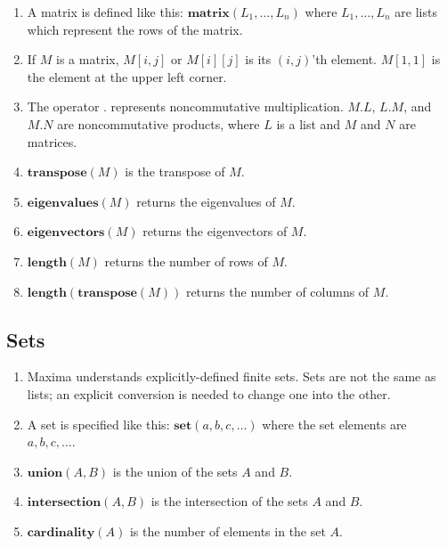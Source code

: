 \documentclass[12pt]{article}
\begin{document}
\begin{enumerate}

\item A matrix is defined like this: $\mathbf{matrix}(L_1, \ldots, L_n)$
    where $L_1, \ldots, L_n$ are lists which represent the rows of the matrix.
    
\item If $M$ is a matrix, $M[i, j]$ or $M[i][j]$ is its $(i, j)$'th element.
    $M[1,1]$ is the element at the upper left corner.

\item The operator $\mathbf{.}$ represents noncommutative multiplication.
    $M . L$, $L . M$, and $M . N$ are noncommutative products,
    where $L$ is a list and $M$ and $N$ are matrices.


\item $\mathbf{transpose}(M)$ is the transpose of $M$.

\item $\mathbf{eigenvalues}(M)$ returns the eigenvalues of $M$.

\item $\mathbf{eigenvectors}(M)$ returns the eigenvectors of $M$.

\item $\mathbf{length}(M)$ returns the number of rows of $M$.

\item $\mathbf{length}(\mathbf{transpose}(M))$ returns the number of columns of $M$.

\end{enumerate}

\subsection{Sets}

\begin{enumerate}

\item Maxima understands explicitly-defined finite sets.
    Sets are not the same as lists; an explicit conversion is needed to change one into the other.
    
\item A set is specified like this:
    $\mathbf{set}(a, b, c, \ldots)$ where the set elements are $a, b, c, \ldots$.

\item $\mathbf{union} (A, B)$ is the union of the sets $A$ and $B$.

\item $\mathbf{intersection} (A, B)$ is the intersection of the sets $A$ and $B$.

\item $\mathbf{cardinality} (A)$ is the number of elements in the set $A$.

\end{enumerate}
\end{document}
